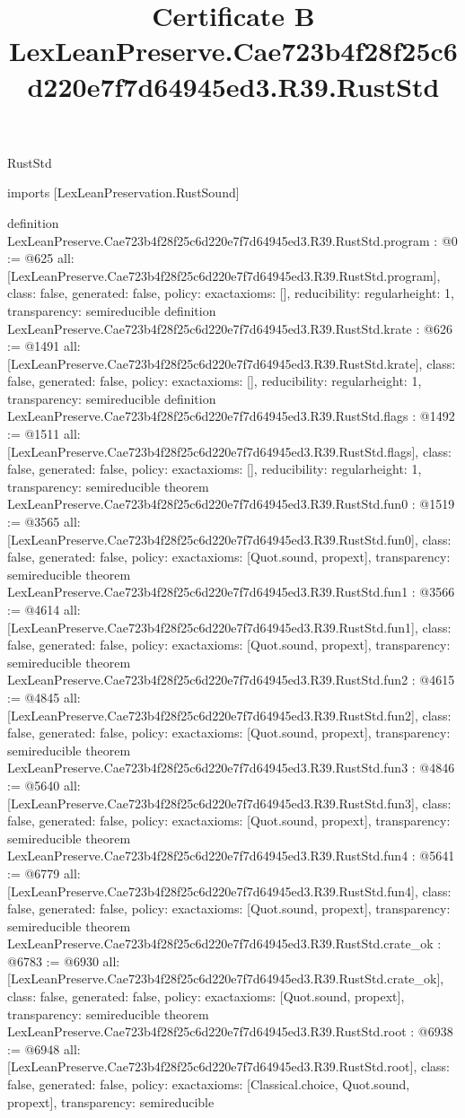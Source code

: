 \begin{lexlean}{RustStd}
\title{Certificate B LexLeanPreserve.Cae723b4f28f25c6d220e7f7d64945ed3.R39.RustStd}
\begin{coremodule}
imports [LexLeanPreservation.RustSound]

definition LexLeanPreserve.Cae723b4f28f25c6d220e7f7d64945ed3.R39.RustStd.program : @0 := @625 {
  all: [LexLeanPreserve.Cae723b4f28f25c6d220e7f7d64945ed3.R39.RustStd.program],
  class: false,
  generated: false,
  policy: exact{axioms: []},
  reducibility: regular{height: 1},
  transparency: semireducible
}
definition LexLeanPreserve.Cae723b4f28f25c6d220e7f7d64945ed3.R39.RustStd.krate : @626 := @1491 {
  all: [LexLeanPreserve.Cae723b4f28f25c6d220e7f7d64945ed3.R39.RustStd.krate],
  class: false,
  generated: false,
  policy: exact{axioms: []},
  reducibility: regular{height: 1},
  transparency: semireducible
}
definition LexLeanPreserve.Cae723b4f28f25c6d220e7f7d64945ed3.R39.RustStd.flags : @1492 := @1511 {
  all: [LexLeanPreserve.Cae723b4f28f25c6d220e7f7d64945ed3.R39.RustStd.flags],
  class: false,
  generated: false,
  policy: exact{axioms: []},
  reducibility: regular{height: 1},
  transparency: semireducible
}
theorem LexLeanPreserve.Cae723b4f28f25c6d220e7f7d64945ed3.R39.RustStd.fun0 : @1519 := @3565 {
  all: [LexLeanPreserve.Cae723b4f28f25c6d220e7f7d64945ed3.R39.RustStd.fun0],
  class: false,
  generated: false,
  policy: exact{axioms: [Quot.sound, propext]},
  transparency: semireducible
}
theorem LexLeanPreserve.Cae723b4f28f25c6d220e7f7d64945ed3.R39.RustStd.fun1 : @3566 := @4614 {
  all: [LexLeanPreserve.Cae723b4f28f25c6d220e7f7d64945ed3.R39.RustStd.fun1],
  class: false,
  generated: false,
  policy: exact{axioms: [Quot.sound, propext]},
  transparency: semireducible
}
theorem LexLeanPreserve.Cae723b4f28f25c6d220e7f7d64945ed3.R39.RustStd.fun2 : @4615 := @4845 {
  all: [LexLeanPreserve.Cae723b4f28f25c6d220e7f7d64945ed3.R39.RustStd.fun2],
  class: false,
  generated: false,
  policy: exact{axioms: [Quot.sound, propext]},
  transparency: semireducible
}
theorem LexLeanPreserve.Cae723b4f28f25c6d220e7f7d64945ed3.R39.RustStd.fun3 : @4846 := @5640 {
  all: [LexLeanPreserve.Cae723b4f28f25c6d220e7f7d64945ed3.R39.RustStd.fun3],
  class: false,
  generated: false,
  policy: exact{axioms: [Quot.sound, propext]},
  transparency: semireducible
}
theorem LexLeanPreserve.Cae723b4f28f25c6d220e7f7d64945ed3.R39.RustStd.fun4 : @5641 := @6779 {
  all: [LexLeanPreserve.Cae723b4f28f25c6d220e7f7d64945ed3.R39.RustStd.fun4],
  class: false,
  generated: false,
  policy: exact{axioms: [Quot.sound, propext]},
  transparency: semireducible
}
theorem LexLeanPreserve.Cae723b4f28f25c6d220e7f7d64945ed3.R39.RustStd.crate_ok : @6783 := @6930 {
  all: [LexLeanPreserve.Cae723b4f28f25c6d220e7f7d64945ed3.R39.RustStd.crate_ok],
  class: false,
  generated: false,
  policy: exact{axioms: [Quot.sound, propext]},
  transparency: semireducible
}
theorem LexLeanPreserve.Cae723b4f28f25c6d220e7f7d64945ed3.R39.RustStd.root : @6938 := @6948 {
  all: [LexLeanPreserve.Cae723b4f28f25c6d220e7f7d64945ed3.R39.RustStd.root],
  class: false,
  generated: false,
  policy: exact{axioms: [Classical.choice, Quot.sound, propext]},
  transparency: semireducible
}


\end{coremodule}
\end{lexlean}
